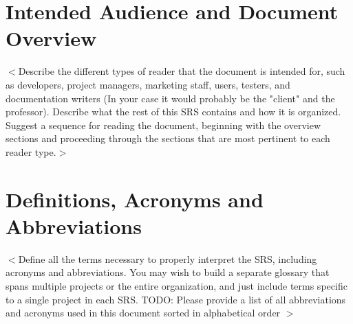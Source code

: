 \documentclass[a4paper, 11pt]{scrreprt}
\begin{document}
\section{Intended Audience and Document Overview}
$<$Describe the different types of reader that the document is intended for, such as developers, project managers, marketing staff, users, testers, and documentation writers (In your case it would probably be the "client" and the professor). Describe what the rest of this SRS contains and how it is organized. Suggest a sequence for reading the document, beginning with the overview sections and proceeding through the sections that are most pertinent to each reader type.$>$

\section{Definitions, Acronyms and Abbreviations}
$<$Define all the terms necessary to properly interpret the SRS, including acronyms and abbreviations. You may wish to build a separate glossary that spans multiple projects or the entire organization, and just include terms specific to a single project in each SRS.
TODO: Please provide a list of all abbreviations and acronyms used in this document sorted in alphabetical order
$>$
\end{document}
